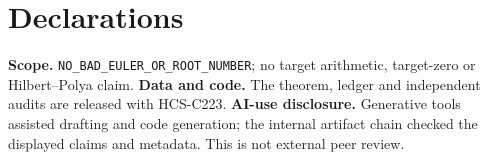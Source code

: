 \documentclass[11pt]{article}
\begin{document}
\section*{Declarations}
\textbf{Scope.} \texttt{NO\_BAD\_EULER\_OR\_ROOT\_NUMBER}; no target
arithmetic, target-zero or Hilbert--Polya claim.  \textbf{Data and code.} The
theorem, ledger and independent audits are released with HCS-C223.
\textbf{AI-use disclosure.} Generative tools assisted drafting and code
generation; the internal artifact chain checked the displayed claims and
metadata.  This is not external peer review.
\end{document}

